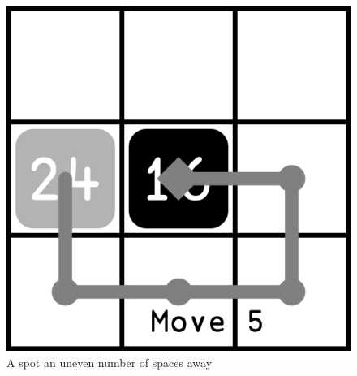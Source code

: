 \begin{figure}
\begin{minipage}{0.3\textwidth}
    \end{minipage}
    \begin{minipage}{0.3\textwidth}
        \includegraphics[width=\textwidth]{../graphics/move-5}
    \end{minipage}
    \caption{A spot an uneven number of spaces away}
    \label{fig:odd-reachability}
\end{figure}